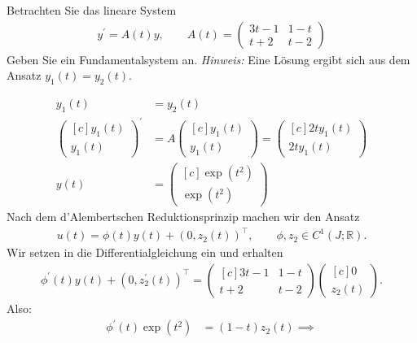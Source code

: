 \begin{exercise}
Betrachten Sie das lineare System
\begin{align*}
  y^{\prime} = A(t)y, \qquad A(t) = \left(\begin{array}{rr}
    3t - 1 & 1 - t \\
    t + 2 & t - 2
  \end{array}\right)
\end{align*}
Geben Sie ein Fundamentalsystem an. \textit{Hinweis:} Eine Lösung ergibt sich
aus dem Ansatz $y_1(t) = y_2(t)$.
\end{exercise}
\begin{solution}
\begin{align*}
  y_1(t) &= y_2(t) \\
 \begin{pmatrix*}[c]
   y_1(t) \\
   y_1(t)
 \end{pmatrix*}^{\prime}
 &= A\begin{pmatrix*}[c]
   y_1(t) \\
   y_1(t)
 \end{pmatrix*} = \begin{pmatrix*}[c]
   2ty_1(t) \\
   2ty_1(t)
 \end{pmatrix*} \\
 y(t) &= \begin{pmatrix*}[c]
  \exp\left(t^2\right) \\
  \exp\left(t^2\right)
 \end{pmatrix*}
\end{align*}
Nach dem d'Alembertschen Reduktionsprinzip machen wir den Ansatz
\begin{align*}
  u(t) = \phi(t)y(t) + (0,z_2(t))^{\top}, \qquad \phi,z_2 \in C^1(J;\mathbb{R}).
\end{align*}
Wir setzen in die Differentialgleichung ein und erhalten
\begin{align*}
  \phi^{\prime}(t)y(t) + (0,z_2^{\prime}(t))^{\top} =
  \begin{pmatrix*}[c]
    3t - 1 & 1 - t \\
    t + 2 & t - 2
  \end{pmatrix*}
  \begin{pmatrix*}[c]
     0 \\
     z_2(t)
  \end{pmatrix*}.
\end{align*}
Also:
\begin{align*}
  \phi^{\prime}(t)\exp(t^2) &= (1 - t)z_2(t) \implies

\end{align*}
\end{solution}

